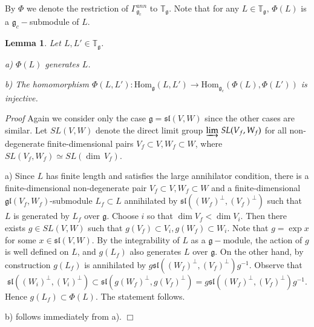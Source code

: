 \documentclass[10pt]{amsart}
\newcounter{theorem}
\newtheorem{lemma}[theo]{Lemma}
\renewenvironment{proof}{ \emph{Proof}}{$\Box$}
\newcommand{\TT}{\mathbb{T}}
\renewcommand{\sl}{\mathfrak{sl}}
\renewcommand{\gg}{\mathfrak{g}}
\newcommand{\gl}{\mathfrak{gl}}
\newcommand{\Hom}{\mathrm{Hom}}
\begin{document}
By $\Phi$ we denote the restriction of $\Gamma^{ann}_{\gg_c}$ to
$\TT_\gg$. Note that 
for any $L \in \TT_\gg,\,\Phi(L)$ is a $\gg_c-$submodule of $L$.

\begin{lemma}\label{propfunctor} Let $L,L'\in\TT_\gg$.

a) $\Phi(L)$ generates $L$.

b) The homomorphism $\Phi(L,L'):\Hom_\gg(L,L')\to\Hom_{\gg_c}(\Phi(L),\Phi(L'))$
is injective.

\end{lemma}

\begin{proof} Again we consider only the case $\gg=\sl(V,W)$ 
since the other cases are similar. Let $SL(V,W)$ denote the direct limit group
$\varinjlim\,SL(V_f,W_f)$ for all non-degenerate finite-dimensional
pairs $V_f \subset V, W_f \subset W$, where $SL(V_f,W_f) \simeq SL(\dim\,V_f)$.

a) Since $L$ has finite length and satisfies the large annihilator
condition, there is a finite-dimensional 
non-degenerate pair $V_f\subset V,W_f\subset W$ and a
finite-dimensional $\gl(V_f,W_f)$-submodule 
$L_f \subset L$ annihilated by $\sl((W_f)^\perp,(V_f)^\perp)$ such
that $L$ is generated by $L_f$ over $\gg$. 
Choose $i$ so that $\dim V_f<\dim V_i$. Then there exists $g\in SL(V,W)$ such that
$g(V_f)\subset V_i,g(W_f)\subset W_i$. Note that $g=\exp x$ for some
$x\in \sl(V,W)$.  
By the integrability of $L$ as a $\gg-$module,
the action of $g$ is well defined on $L$, and $g(L_f)$ also generates
$L$ over $\gg$. 
On the other hand, by construction $g(L_f)$ is annihilated by $g\sl((W_f)^\perp,(V_f)^\perp)g^{-1}$.
Observe that
$$\sl((W_i)^\perp,(V_i)^\perp)\subset\sl(g(W_f)^\perp,g(V_f)^\perp)=g\sl((W_f)^\perp,(V_f)^\perp)g^{-1}.$$ 
Hence $g(L_f)\subset\Phi(L)$. The statement follows.

b) follows immediately from a).
\end{proof}
\end{document}
